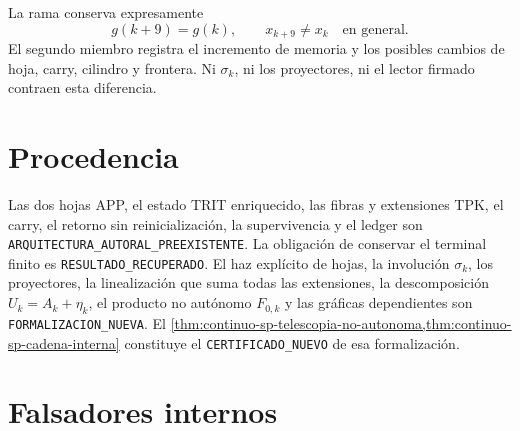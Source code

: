 La rama conserva expresamente
\begin{equation}
\label{eq:continuo-sp-no-reset}
 g(k+9)=g(k),
 \qquad
 x_{k+9}\neq x_k\quad\text{en general}.
\end{equation}
El segundo miembro registra el incremento de memoria y los posibles cambios
de hoja, carry, cilindro y frontera. Ni \(\sigma_k\), ni los proyectores, ni
el lector firmado contraen esta diferencia.

\iffalse
\section{Procedencia}

Las dos hojas APP, el estado TRIT enriquecido, las fibras y extensiones TPK,
el carry, el retorno sin reinicialización, la supervivencia y el ledger son
\texttt{ARQUITECTURA\_AUTORAL\_PREEXISTENTE}. La obligación de conservar el
terminal finito es \texttt{RESULTADO\_RECUPERADO}. El haz explícito de hojas,
la involución \(\sigma_k\), los proyectores, la linealización que suma todas
las extensiones, la descomposición \(U_k=A_k+\eta_k\), el producto no
autónomo \(F_{0,k}\) y las gráficas dependientes son
\texttt{FORMALIZACION\_NUEVA}. El
\cref{thm:continuo-sp-telescopia-no-autonoma,thm:continuo-sp-cadena-interna}
constituye el \texttt{CERTIFICADO\_NUEVO} de esa formalización.

\section{Falsadores internos}

